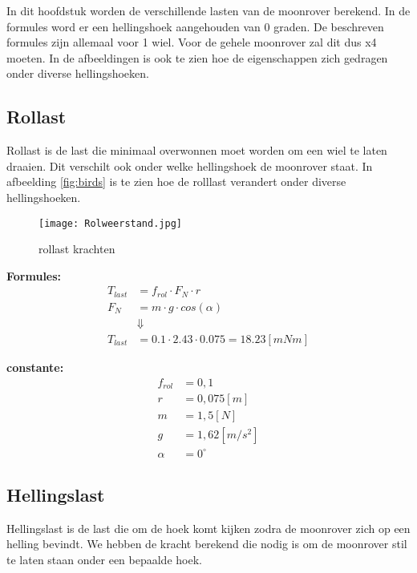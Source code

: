 In dit hoofdstuk worden de verschillende lasten van de moonrover berekend. In de formules word er een hellingshoek aangehouden van 0 graden. De beschreven formules zijn allemaal voor 1 wiel. Voor de gehele moonrover zal dit dus x4 moeten. In de afbeeldingen is ook te zien hoe de eigenschappen zich gedragen onder diverse hellingshoeken.

\subsection{Rollast}
    Rollast is de last die minimaal overwonnen moet worden om een wiel te laten draaien. Dit verschilt ook onder welke hellingshoek de moonrover staat. In afbeelding \ref{fig:birds} is te zien hoe de rolllast verandert onder diverse hellingshoeken.

    \begin{figure}[H]
        \centering
        \texttt{[image: Rolweerstand.jpg]}
        \caption{rollast krachten}
    \end{figure}

    \begin{multicols}{2}
        \textbf{Formules:}
        \begin{equation}
            \begin{split}
                T_{last} &= f_{rol} \cdot F_{N} \cdot r \\
                F_{N} &= m \cdot g \cdot cos(\alpha) \\
                &\Downarrow \\
                T_{last} &= 0.1 \cdot 2.43 \cdot 0.075 = 18.23 [mNm]
            \end{split}
        \end{equation}

        \textbf{constante:}
        \begin{equation*}
            \begin{split}
                f_{rol} &= 0,1 \\
                r &= 0,075 [m] \\
                m &= 1,5 [N] \\
                g &= 1,62 [m/s^2] \\
                \alpha &= 0^\circ
            \end{split}
        \end{equation*}
    \end{multicols}

\subsection{Hellingslast}
    Hellingslast is de last die om de hoek komt kijken zodra de moonrover zich op een helling bevindt. We hebben de kracht berekend die nodig is om de moonrover stil te laten staan onder een bepaalde hoek.

